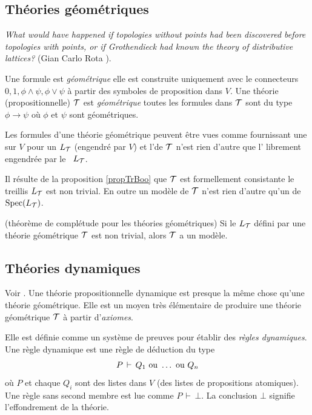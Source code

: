 \subsection{Théories géométriques}

{\em What would have happened if topologies without points
had been discovered before topologies with points, or if
Grothendieck had known the theory of distributive lattices?}  (Gian Carlo Rota \cite{Rota}).


\smallskip 
Une formule est \emph{géométrique} \ssi elle est construite uniquement avec le connecteurs
 $0,1,\phi\wedge\psi,\phi\vee\psi$ à partir des symboles de proposition dans $V$. Une théorie (propositionnelle) ${\cal T}$ est \emph{géométrique} 
 \ssi toutes les formules dans ${\cal T}$ sont du type $\phi\rightarrow \psi$ 
où $\phi$
et $\psi$ sont géométriques.

Les formules d'une théorie géométrique peuvent être vues comme fournissant une \entrel sur $V$ pour un \trdi $L_{\cal T}$ (engendré par $V$)
et l'\agL de ${\cal T}$ n'est rien d'autre que l'\agB
 librement engendrée par le \trdi~$L_{\cal T}$. 
 
Il résulte de la proposition
\ref{propTrBoo} que ${\cal T}$ est formellement consistante \ssi le treillis $L_{\cal T}$ est non trivial.
En outre un modèle de ${\cal T}$ n'est rien d'autre qu'un \elt de~${\rm Spec}(L_{\cal T})$.

\begin{theorem}
(théorème de complétude pour les théories géométriques) Si  le \trdi $L_{\cal T}$ défini par une théorie géométrique ${\cal T}$ est non trivial, alors
${\cal T}$ a un modèle.
\end{theorem}


\subsection{Théories dynamiques}

Voir  \cite{clr}. Une théorie propositionnelle dynamique est presque la même chose qu'une théorie géométrique. Elle est un moyen très élémentaire de produire une théorie géométrique ${\cal T}$ à partir d'\emph{axiomes}. 

Elle est définie comme un système de preuves pour 
établir des \emph{règles dynamiques}.
Une règle dynamique est une règle de déduction du type
$$
P \,\vdash\, Q_1 \hbox{ ou } \dots \hbox{ ou } Q_n
$$
où $P$ et chaque $Q_i$ sont des listes dans $V$ (des listes de propositions atomiques).
Une règle sans second membre est lue comme $P \,\vdash\, \bot$. La conclusion $\bot$ signifie l'effondrement de la théorie.

